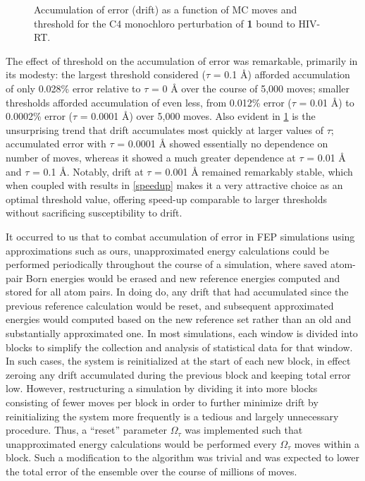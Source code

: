 \documentclass[12pt]{report}
\begin{document}
\begin{figure}[t]
\centering

\caption{Accumulation of error (drift) as a function of MC moves and threshold for the C4 monochloro perturbation of \textbf{1} bound to HIV-RT.}
\label{drift}
\end{figure}

The effect of threshold on the accumulation of error was remarkable, primarily in its modesty: the largest threshold considered ($\tau$ = 0.1 \AA) afforded accumulation of only 0.028\% error relative to $\tau$ = 0 \AA{} over the course of 5,000 moves; smaller thresholds afforded accumulation of even less, from 0.012\% error ($\tau$ = 0.01 \AA) to 0.0002\% error ($\tau$ = 0.0001 \AA) over 5,000 moves. Also evident in \cref{drift} is the unsurprising trend that drift accumulates most quickly at larger values of $\tau$; accumulated error with $\tau$ = 0.0001 \AA{} showed essentially no dependence on number of moves, whereas it showed a much greater dependence at $\tau$ = 0.01 \AA{} and $\tau$ = 0.1 \AA. Notably, drift at $\tau$ = 0.001 \AA{} remained remarkably stable, which when coupled with results in \cref{speedup} makes it a very attractive choice as an optimal threshold value, offering speed-up comparable to larger thresholds without sacrificing susceptibility to drift. 

It occurred to us that to combat accumulation of error in FEP simulations using approximations such as ours, unapproximated energy calculations could be performed periodically throughout the course of a simulation, where saved atom-pair Born energies would be erased and new reference energies computed and stored for all atom pairs. In doing do, any drift that had accumulated since the previous reference calculation would be reset, and subsequent approximated energies would computed based on the new reference set rather than an old and substantially approximated one. In most simulations, each window is divided into blocks to simplify the collection and analysis of statistical data for that window. In such cases, the system is reinitialized at the start of each new block, in effect zeroing any drift accumulated during the previous block and keeping total error low. However, restructuring a simulation by dividing it into more blocks consisting of fewer moves per block in order to further minimize drift by reinitializing the system more frequently is a tedious and largely unnecessary procedure. Thus, a ``reset'' parameter $\Omega_\tau$ was implemented such that unapproximated energy calculations would be performed every $\Omega_\tau$ moves within a block. Such a modification to the algorithm was trivial and was expected to lower the total error of the ensemble over the course of millions of moves.
\end{document}
